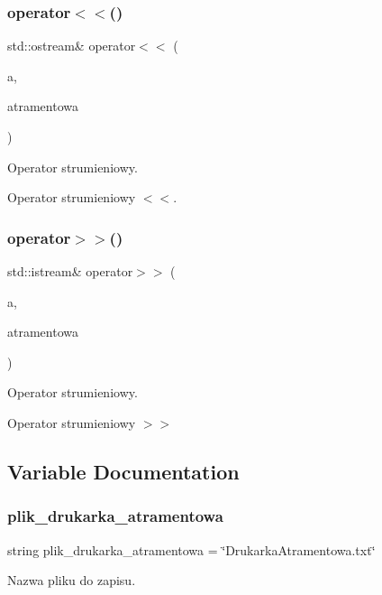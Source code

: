 \subsubsection{operator$<$$<$()}
{\footnotesize\ttfamily std\+::ostream\& operator$<$$<$ (\begin{DoxyParamCaption}\item[{std\+::ostream \&}]{a,  }\item[{\textbf{ Drukarka\+Atramentowa} \&}]{atramentowa }\end{DoxyParamCaption})}



Operator strumieniowy. 

Operator strumieniowy $<$$<$. \mbox{\label{_drukarka_atramentowa_8cpp_ad81030cdd68ff1bd6990456164f9fe44}} 
\subsubsection{operator$>$$>$()}
{\footnotesize\ttfamily std\+::istream\& operator$>$$>$ (\begin{DoxyParamCaption}\item[{std\+::istream \&}]{a,  }\item[{\textbf{ Drukarka\+Atramentowa} \&}]{atramentowa }\end{DoxyParamCaption})}



Operator strumieniowy. 

Operator strumieniowy $>$$>$ 

\subsection{Variable Documentation}
\mbox{\label{_drukarka_atramentowa_8cpp_ab7f09af0ffaa32dae41ba70972c198bf}} 
\subsubsection{plik\+\_\+drukarka\+\_\+atramentowa}
{\footnotesize\ttfamily string plik\+\_\+drukarka\+\_\+atramentowa = \char`\"{}Drukarka\+Atramentowa.\+txt\char`\"{}}



Nazwa pliku do zapisu. 

